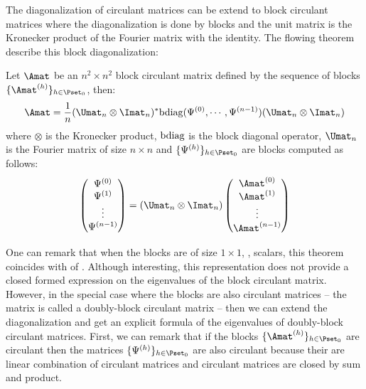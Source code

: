 \noindent
The diagonalization of circulant matrices can be extend to block circulant matrices where the diagonalization is done by blocks and the unit matrix is the Kronecker product of the Fourier matrix with the identity.
The flowing theorem describe this block diagonalization:
\begin{theorem}
  Let $\Amat$ be an $n^2 \times n^2$ block circulant matrix defined by the sequence of blocks $\{\Amat^{(h)}\}_{h \in \Pset_0}$, then:
  \begin{equation} \label{equation:ch2-block_diagonalization_block_circulant}
    \Amat = \frac{1}{n} (\Umat_n \otimes \Imat_n)^* \bdiag(\Psi^{(0)}, \cdots, \Psi^{(n-1)}) (\Umat_n \otimes \Imat_n)
  \end{equation}
  where $\otimes$ is the Kronecker product, $\mathrm{bdiag}$ is the block diagonal operator, $\Umat_n$ is the Fourier matrix of size $n \times n$ and $\{\Psi^{(h)}\}_{h \in \Pset_0}$ are blocks computed as follows:
  \begin{equation}
    \leftmatrix
      \Psi^{(0)} \\
      \Psi^{(1)} \\
      \vdots \\
      \Psi^{(n-1)} \\
    \rightmatrix = 
    (\Umat_n \otimes \Imat_n)
    \leftmatrix
      \Amat^{(0)} \\
      \Amat^{(1)} \\
      \vdots \\
      \Amat^{(n-1)} \\
    \rightmatrix
  \end{equation}
  \removespace
\end{theorem}
\noindent
One can remark that when the blocks are of size $1 \times 1$, \ie, scalars, this theorem coincides with  of .
Although interesting, this representation does not provide a closed formed expression on the eigenvalues of the block circulant matrix.
However, in the special case where the blocks are also circulant matrices -- the matrix is called a doubly-block circulant matrix -- then we can extend the diagonalization and get an explicit formula of the eigenvalues of doubly-block circulant matrices.
First, we can remark that if the blocks $\{\Amat^{(h)}\}_{h \in \Pset_0}$ are circulant then the matrices $\{\Psi^{(h)}\}_{h \in \Pset_0}$ are also circulant because their are linear combination of circulant matrices and circulant matrices are closed by sum and product. 
